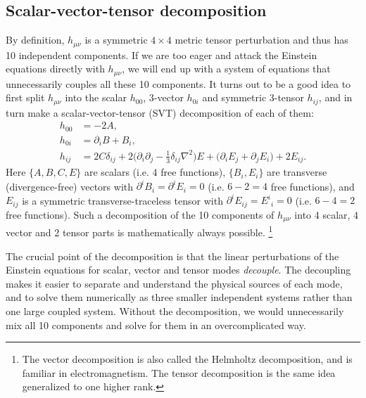 \documentclass[USenglish, thumbmarks]{uiophdthesis} %
\begin{document}
\subsection{Scalar-vector-tensor decomposition}
\label{sec:svt}

By definition, $h_{\mu\nu}$ is a symmetric $4 \times 4$ metric tensor perturbation and thus has 10 independent components.
If we are too eager and attack the Einstein equations directly with $h_{\mu\nu}$,
we will end up with a system of equations that unnecessarily couples all these 10 components.
It turns out to be a good idea to first split $h_{\mu\nu}$ into the scalar $h_{00}$, 3-vector $h_{0i}$ and symmetric 3-tensor $h_{ij}$,
and in turn make a scalar-vector-tensor (SVT) decomposition of each of them:
\begin{subequations}
\label{eq:metric_perturbation_decomposition}
\begin{align}
h_{00} &= -2 A , \\
h_{0i} &= \partial_i B + B_i, \\
h_{ij} &= 2 C \delta_{ij} + 2 \big( \partial_i \partial_j - \tfrac13 \delta_{ij} \nabla^2 \big) E + \big( \partial_i E_j + \partial_j E_i \big) + 2 E_{ij} .
\end{align}
\end{subequations}
Here $\{A,B,C,E\}$ are scalars (i.e. 4 free functions),
$\{B_i,E_i\}$ are transverse (divergence-free) vectors with $\partial^i B_i = \partial^i E_i = 0$ (i.e. $6-2=4$ free functions),
and $E_{ij}$ is a symmetric transverse-traceless tensor with $\partial^i E_{ij} = E^i{}_i = 0$ (i.e. $6-4=2$ free functions).
Such a decomposition of the 10 components of $h_{\mu\nu}$ into 4 scalar, 4 vector and 2 tensor parts is mathematically always possible.%
\footnote{The vector decomposition is also called the Helmholtz decomposition, and is familiar in electromagnetism.
The tensor decomposition is the same idea generalized to one higher rank.}

The crucial point of the decomposition is that the linear perturbations of the Einstein equations for scalar, vector and tensor modes \emph{decouple}.
The decoupling makes it easier to separate and understand the physical sources of each mode,
and to solve them numerically as three smaller independent systems rather than one large coupled system.
Without the decomposition, we would unnecessarily mix all 10 components
and solve for them in an overcomplicated way.
\end{document}
